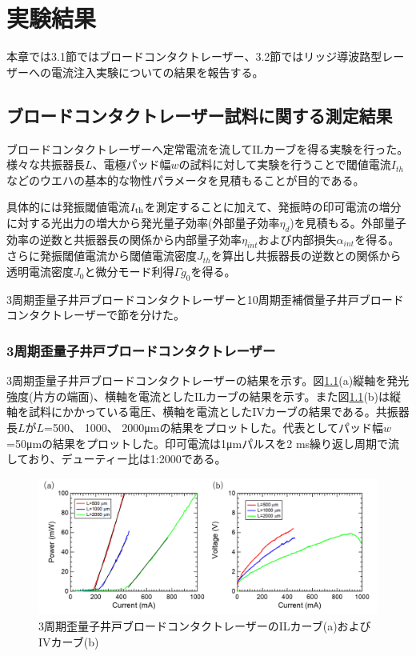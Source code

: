 \chapter{実験結果}
本章では3.1節ではブロードコンタクトレーザー、3.2節ではリッジ導波路型レーザーへの電流注入実験についての結果を報告する。
\section{ブロードコンタクトレーザー試料に関する測定結果}%
ブロードコンタクトレーザーへ定常電流を流してILカーブを得る実験を行った。様々な共振器長$L$、電極パッド幅$w$の試料に対して実験を行うことで閾値電流$I_{th}$などのウエハの基本的な物性パラメータを見積もることが目的である。

具体的には発振閾値電流$I_{\rm{th}}$を測定することに加えて、発振時の印可電流の増分に対する光出力の増大から発光量子効率(外部量子効率$\eta_{d}$)を見積もる。外部量子効率の逆数と共振器長の関係から内部量子効率$\eta_{int}$および内部損失$\alpha_{int}$を得る。さらに発振閾値電流から閾値電流密度$J_{th}$を算出し共振器長の逆数との関係から透明電流密度$J_{0}$と微分モード利得$\Gamma g_{0}$を得る。

3周期歪量子井戸ブロードコンタクトレーザーと10周期歪補償量子井戸ブロードコンタクトレーザーで節を分けた。
\subsection{3周期歪量子井戸ブロードコンタクトレーザー}%
3周期歪量子井戸ブロードコンタクトレーザーの結果を示す。図\ref{fig:fig_3_1_3QW_broacdcontact_IL}(a)縦軸を発光強度(片方の端面)、横軸を電流としたILカーブの結果を示す。また図\ref{fig:fig_3_1_3QW_broacdcontact_IL}(b)は縦軸を試料にかかっている電圧、横軸を電流としたIVカーブの結果である。共振器長$L$が$L$=500、 1000、 2000\si{ \micro\metre}の結果をプロットした。代表としてパッド幅$w$=50\si{ \micro\metre}の結果をプロットした。印可電流は1\si{ \micro\metre}パルスを2 ms繰り返し周期で流しており、デューティー比は1:2000である。

\begin{figure}[h]
	\centering
	\includegraphics[width=15cm]{figure/fig_3_1_3QW_broadcontact_IL.png}
		\caption{3周期歪量子井戸ブロードコンタクトレーザーのILカーブ(a)およびIVカーブ(b)}
		\label{fig:fig_3_1_3QW_broacdcontact_IL}
\end{figure}

